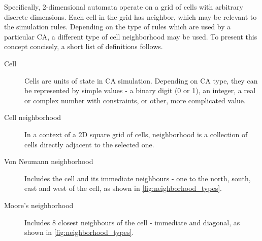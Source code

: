 \documentclass[12pt]{report}
\begin{document}
Specifically, 2-dimensional automata operate on a grid of cells with arbitrary discrete dimensions. Each cell in the grid has neighbor, which may be relevant to the simulation rules. Depending on the type of rules which are used by a particular CA, a different type of cell neighborhood may be used. To present this concept concisely, a short list of definitions follows.

\begin{description}
	\item[Cell] Cells are units of state in CA simulation. Depending on CA type, they can be represented by simple values - a binary digit (0 or 1), an integer, a real or complex number with constraints, or other, more complicated value.  
	\item[Cell neighborhood] In a context of a 2D square grid of cells, neighborhood is a collection of cells directly adjacent to the selected one.
	\item[Von Neumann neighborhood] Includes the cell and its immediate neighbours - one to the north, south, east and west of the cell, as shown in  \cref{fig:neighborhood_types}.
	\item[Moore's neighborhood] Includes 8 closest neighbours of the cell - immediate and diagonal, as shown in  \cref{fig:neighborhood_types}.
\end{description}
 
\end{document}
